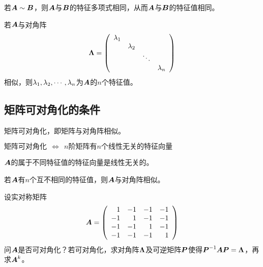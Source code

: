 \begin{frame}[fragile]\ft{\subsecname}
\begin{dingli}
若$\boldsymbol{A}\sim \boldsymbol{B}$，则$\boldsymbol{A}$与$\boldsymbol{B}$的特征多项式相同，从而$\boldsymbol{A}$与$\boldsymbol{B}$的特征值相同。
\end{dingli}

\begin{tuilun}
  若$\boldsymbol{A}$与对角阵
  $$
  \boldsymbol{\Lambda}=\left(
    \begin{array}{cccc}
      \lambda_1&&&\\
               &\lambda_2&&\\
               &&\ddots&\\
               &&&\lambda_n
    \end{array}
  \right)
  $$
  相似，则$\lambda_1,\lambda_2,\cdots,\lambda_n$为$\boldsymbol{A}$的$n$个特征值。
\end{tuilun}
\end{frame}

\subsection{矩阵可对角化的条件}
\begin{frame}[fragile]\ft{\subsecname}
矩阵可对角化，即矩阵与对角阵相似。    

\begin{dingli}
  $\mbox{矩阵可对角化} ~~\Longleftrightarrow~~
  \mbox{$n$阶矩阵有$n$个线性无关的特征向量}$ 
\end{dingli}
\end{frame}

\begin{frame}[fragile]\ft{\subsecname}


\begin{dingli}
  $\boldsymbol{A}$的属于不同特征值的特征向量是线性无关的。
\end{dingli} 

\begin{tuilun}
  若$\boldsymbol{A}$有$n$个互不相同的特征值，则$\boldsymbol{A}$与对角阵相似。
\end{tuilun}


\end{frame}

\begin{frame}[fragile]\ft{\subsecname}



\begin{li}
  设实对称矩阵
  $$
  \boldsymbol{A}=\left(
    \begin{array}{rrrr}
      1&-1&-1&-1\\
      -1&1&-1&-1\\
      -1&-1&1&-1\\
      -1&-1&-1&1
    \end{array}
  \right)
  $$
  问$\boldsymbol{A}$是否可对角化？若可对角化，求对角阵$\boldsymbol{\Lambda}$及可逆矩阵$\boldsymbol{P}$使得$\boldsymbol{P}^{-1}\boldsymbol{A}\boldsymbol{P}=\boldsymbol{\Lambda}$，再求$\boldsymbol{A}^k$。
\end{li}
\end{frame}


